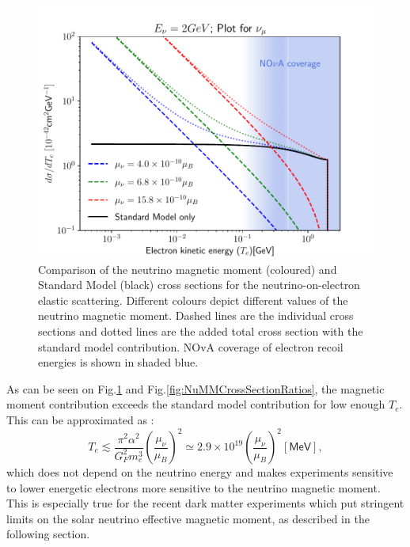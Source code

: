\begin{figure}[hbtp]
\centering
\includegraphics[width=.7\textwidth]{Plots/NuMM/dSdTNumuMMCompAltLim.pdf}
\caption{Comparison of the neutrino magnetic moment (coloured) and Standard Model (black) cross sections for the neutrino-on-electron elastic scattering. Different colours depict different values of the neutrino magnetic moment. Dashed lines are the individual cross sections and dotted lines are the added total cross section with the standard model contribution. NOvA coverage of electron recoil energies is shown in shaded blue.}
\label{fig:NuMMCrossSectionComparison}
\end{figure}

As can be seen on Fig.\ref{fig:NuMMCrossSectionComparison} and Fig.\ref{fig:NuMMCrossSectionRatios}, the magnetic moment contribution exceeds the standard model contribution for low enough $T_e$. This can be approximated as \cite{nuElmagInt2015.pdf}:
\begin{equation}
T_e\lesssim\frac{\pi^2\alpha^2}{G_F^2m_e^3}\left(\frac{\mu_{\nu}}{\mu_B}\right)^2\simeq 2.9\times 10^{19}\left(\frac{\mu_{\nu}}{\mu_B}\right)^2\left[\textsf{MeV}\right],
\end{equation}
which does not depend on the neutrino energy and makes experiments sensitive to lower energetic electrons more sensitive to the neutrino magnetic moment. This is especially true for the recent dark matter experiments which put stringent limits on the solar neutrino effective magnetic moment, as described in the following section.

